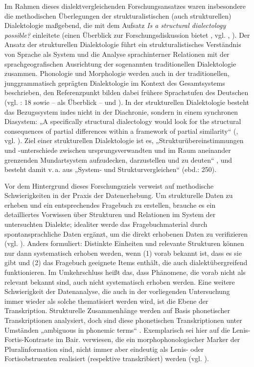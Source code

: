 Im Rahmen dieses dialektvergleichenden Forschungsansatzes waren insbesondere die methodischen Überlegungen der strukturalistischen (auch strukturellen) Dialektologie maßgebend, die \citet{Weinreich1954} mit dem Aufsatz \textit{Is a structural dialectology possible?} einleitete (einen Überblick zur Forschungsdiskussion bietet \citealt{Gordon2018}, vgl. \citealt{Barbiers2010}, \citealt{Jongen1982}). Der Ansatz der strukturellen Dialektologie führt ein strukturalistisches Verständnis von Sprache als System und die Analyse sprachinterner Relationen mit der sprachgeografischen Ausrichtung der sogenannten traditionellen Dialektologie zusammen. Phonologie und Morphologie werden auch in der traditionellen, junggrammatisch geprägten Dialektologie im Kontext des Gesamtsystems beschrieben, den Referenzpunkt bilden dabei frühere Sprachstufen des Deutschen (vgl. \citealt{Rowley1997}: 18 sowie -- als Überblick -- \citealt{Murray2010} und \citealt{Schrambke2010}). In der strukturellen Dialektologie besteht das Bezugssystem indes nicht in der Diachronie, sondern in einem synchronen Diasystem: „A specifically structural dialectology would look for the structural consequences of partial differences within a framework of partial similarity“ (\citealt[390]{Weinreich1954}, vgl. \citealt[453]{Moulton1962}). Ziel einer strukturellen Dialektologie ist es, „Strukturübereinstimmungen und -unterschiede zwischen ursprungsverwandten und im Raum aneinander grenzenden Mundartsystem aufzudecken, darzustellen und zu deuten“ \citep[248]{Jongen1982}, und besteht damit v.\,a. aus „System- und Strukturvergleichen“ (ebd.: 250).

Vor dem Hintergrund dieses Forschungsziels verweist \citet{Pilch1972} auf methodische Schwierigkeiten in der Praxis der Datenerhebung. Um strukturelle Daten zu erheben und ein entsprechendes Fragebuch zu erstellen, brauche es ein detailliertes Vorwissen über Strukturen und Relationen im System der untersuchten Dialekte; idealiter werde das Fragebuchmaterial durch spontansprachliche Daten ergänzt, um die direkt erhobenen Daten zu verifizieren (vgl. \citealt[180]{Pilch1972}). Anders formuliert: Distinkte Einheiten und relevante Strukturen können nur dann systematisch erhoben werden, wenn (1) vorab bekannt ist, dass es sie gibt und (2) das Fragebuch geeignete Items enthält, die auch dialektübergreifend funktionieren. Im Umkehrschluss heißt das, dass Phänomene, die vorab nicht als relevant bekannt sind, auch nicht systematisch erhoben werden. Eine weitere Schwierigkeit der Datenanalyse, die auch in der vorliegenden Untersuchung immer wieder als solche thematisiert werden wird, ist die Ebene der Transkription. Strukturelle Zusammenhänge werden auf Basis phonetischer Transkriptionen analysiert, doch sind diese phonetischen Transkriptionen unter Umständen „ambiguous in phonemic terms“ \citep[81]{Gordon2018}. Exemplarisch sei hier auf die Lenis-Fortis-Kontraste im Bair. verwiesen, die ein morphophonologischer Marker der Pluralinformation sind, nicht immer aber eindeutig als Lenis- oder Fortisobstruenten realisiert (respektive transkribiert) werden (vgl. ).

